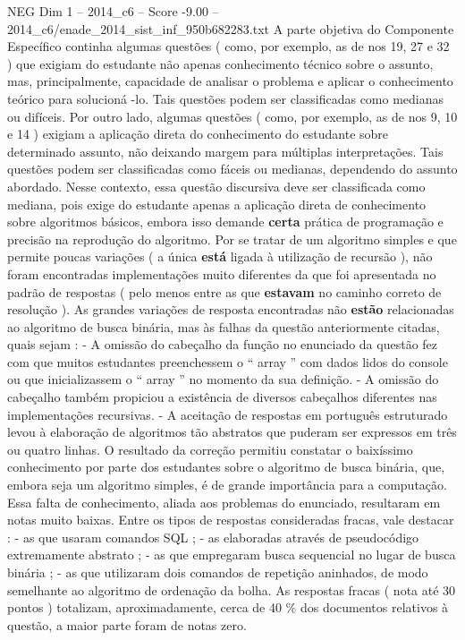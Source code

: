 \begin{textsample}{NEG Dim 1 – 2014\_c6 – Score -9.00 – 2014\_c6/enade\_2014\_sist\_inf\_950b682283.txt}
A parte objetiva do Componente Específico continha algumas questões ( como, por exemplo, as de nos 19, 27 e 32 ) que exigiam do estudante não apenas conhecimento técnico sobre o assunto, mas, principalmente, capacidade de analisar o problema e aplicar o conhecimento teórico para solucioná -lo.
Tais questões podem ser classificadas como medianas ou difíceis.
Por outro lado, algumas questões ( como, por exemplo, as de nos 9, 10 e 14 ) exigiam a aplicação direta do conhecimento do estudante sobre determinado assunto, não deixando margem para múltiplas interpretações.
Tais questões podem ser classificadas como fáceis ou medianas, dependendo do assunto abordado.
Nesse contexto, essa questão discursiva deve ser classificada como mediana, pois exige do estudante apenas a aplicação direta de conhecimento sobre algoritmos básicos, embora isso demande \textbf{certa} prática de programação e precisão na reprodução do algoritmo.
Por se tratar de um algoritmo simples e que permite poucas variações ( a única \textbf{está} ligada à utilização de recursão ), não foram encontradas implementações muito diferentes da que foi apresentada no padrão de respostas ( pelo menos entre as que \textbf{estavam} no caminho correto de resolução ).
As grandes variações de resposta encontradas não \textbf{estão} relacionadas ao algoritmo de busca binária, mas às falhas da questão anteriormente citadas, quais sejam : - A omissão do cabeçalho da função no enunciado da questão fez com que muitos estudantes preenchessem o “ array ” com dados lidos do console ou que inicializassem o “ array ” no momento da sua definição. - A omissão do cabeçalho também propiciou a existência de diversos cabeçalhos diferentes nas implementações recursivas. - A aceitação de respostas em português estruturado levou à elaboração de algoritmos tão abstratos que puderam ser expressos em três ou quatro linhas.
O resultado da correção permitiu constatar o baixíssimo conhecimento por parte dos estudantes sobre o algoritmo de busca binária, que, embora seja um algoritmo simples, é de grande importância para a computação.
Essa falta de conhecimento, aliada aos problemas do enunciado, resultaram em notas muito baixas.
Entre os tipos de respostas consideradas fracas, vale destacar : - as que usaram comandos SQL ; - as elaboradas através de pseudocódigo extremamente abstrato ; - as que empregaram busca sequencial no lugar de busca binária ; - as que utilizaram dois comandos de repetição aninhados, de modo semelhante ao algoritmo de ordenação da bolha.
As respostas fracas ( nota até 30 pontos ) totalizam, aproximadamente, cerca de 40 \% dos documentos relativos à questão, a maior parte foram de notas zero.

\end{textsample}
